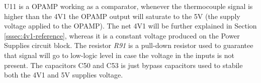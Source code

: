 	U11 is a OPAMP working as a comparator, whenever the thermocouple signal is higher than the 4V1 the OPAMP output will saturate to the 5V (the supply voltage applied to the OPAMP). The net 4V1 will be further explained in Section \ref{sssec:4v1-reference}, whereas it is a constant voltage produced on the Power Supplies circuit block. The resistor \textit{R91} is a pull-down resistor used to guarantee that signal will go to low-logic level in case the voltage in the inputs is not present. The capacitors C50 and C53 is just bypass capacitors used to stabile both the 4V1 and 5V supplies voltage.